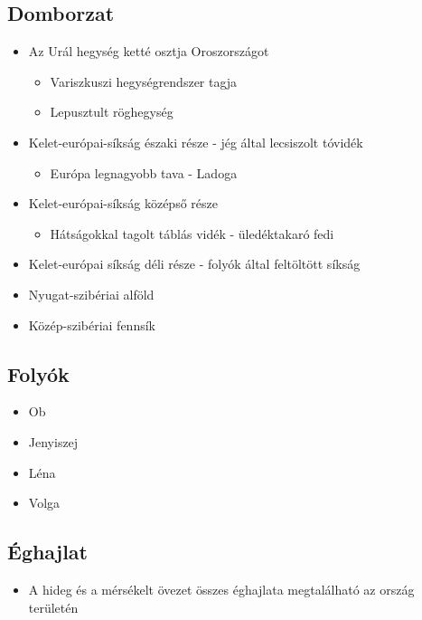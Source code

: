 \documentclass{article}
\begin{document}
\subsection{Domborzat}
\begin{itemize}
    \item Az Urál hegység ketté osztja Oroszországot \begin{itemize}
        \item Variszkuszi hegységrendszer tagja
        \item Lepusztult röghegység
    \end{itemize}
    \item Kelet-európai-síkság északi része - jég által lecsiszolt tóvidék 
    \begin{itemize}
        \item Európa legnagyobb tava - Ladoga 
    \end{itemize}
    \item Kelet-európai-síkság középső része \begin{itemize}
        \item Hátságokkal tagolt táblás vidék - üledéktakaró fedi 
    \end{itemize}
    \item Kelet-európai síkság déli része - folyók által feltöltött síkság
    \item Nyugat-szibériai alföld 
    \item Közép-szibériai fennsík
\end{itemize}

\subsection{Folyók}
\begin{itemize}
    \item Ob
    \item Jenyiszej
    \item Léna
    \item Volga
\end{itemize}

\subsection{Éghajlat}
\begin{itemize}
    \item A hideg és a mérsékelt övezet összes éghajlata megtalálható az ország területén
\end{itemize}
\end{document}
